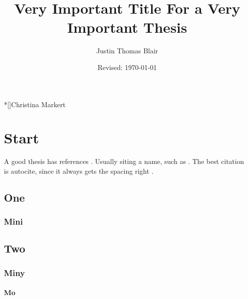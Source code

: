 \documentclass{utthesis}
\begin{document}
\author{Justin Thomas Blair} 
\title{Very Important Title For a Very Important Thesis} 
\date{Revised: \today}

\frontmatter

\UTcopyrightlegend %

\begin{UTcommittee}
\end{UTcommittee}


\setcounter{page}{4}



%
%

\begin{UTabstract}*[]{Christina Markert}
    
\end{UTabstract}


\tableofcontents

\listoffigures

\mainmatter

\chapter{Start}
A good thesis has references \cite{bib:somebook}. Usually siting a name, such as \textcite{bib:someart}. The best citation is autocite, since it always gets the spacing right \autocite{bib:somethesis}.

\lipsum[3]
\section{One}
\subsection{Mini}
\section{Two}
\subsection{Miny}
\subsubsection{Mo}
\end{document}
